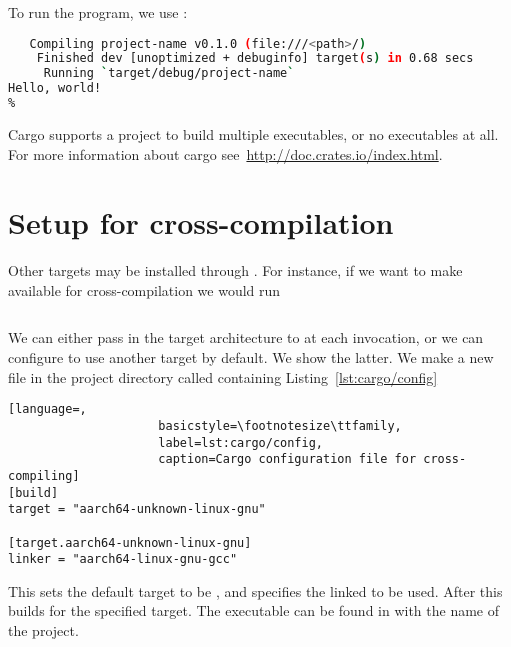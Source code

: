 \documentclass[b5paper,twoside]{report}
\begin{document}
\begin{appendices}
  To run the program, we use \cargo{}:
  \begin{lstlisting}[language=Bash,numbers=none]
% cargo run
   Compiling project-name v0.1.0 (file:///<path>/)
    Finished dev [unoptimized + debuginfo] target(s) in 0.68 secs
     Running `target/debug/project-name`
Hello, world!
%
  \end{lstlisting}

  Cargo supports a project to build multiple executables, or no executables at all.
  For more information about cargo see~\url{http://doc.crates.io/index.html}.


  \section*{Setup for cross-compilation}
  Other targets may be installed through \rustup{}. For instance, if we want to
  make  available for cross-compilation we would run
  \begin{lstlisting}[language=Bash,numbers=none]
% rustup target add aarch64-unknown-linux-gnu
  \end{lstlisting}
  We can either pass in the target architecture to \cargo{} at each invocation,
  or we can configure \cargo{} to use another target by default. We show the latter.
  We make a new file in the project directory called 
  containing Listing~\ref{lst:cargo/config}
  \begin{lstlisting}[language=,
                     basicstyle=\footnotesize\ttfamily,
                     label=lst:cargo/config,
                     caption=Cargo configuration file for cross-compiling]
[build]
target = "aarch64-unknown-linux-gnu"

[target.aarch64-unknown-linux-gnu]
linker = "aarch64-linux-gnu-gcc"
  \end{lstlisting}
  This sets the default target to be ,
  and specifies the linked to be used.
  After this  builds for the specified target.
  The executable can be found in 
  with the name of the project.




\end{appendices}



\end{document}

